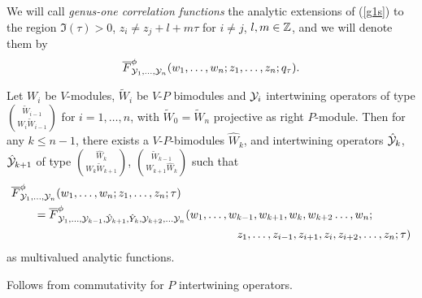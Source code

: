 \documentclass[12pt]{article}
\begin{document}
We will call \emph{genus-one correlation functions} the analytic extensions
of (\ref{g1s}) to the region $\Im (\tau) >0$,
$z_i \neq z_j + l + m\tau$ for $i\neq j$, $l,m\in \mathbb{Z}$,
and we will denote them by
$$
  \overline F^\phi_{\mathcal{Y}_1,\ldots, \mathcal{Y}_n}(w_1,\ldots, w_n; z_1,\ldots, z_n; q_\tau).
$$

\begin{prop}
  Let $W_i$ be $V$-modules, $\tilde W_i$ be $V$-$P$ bimodules
  and $\mathcal{Y}_i$ intertwining operators of type
  $\binom{\tilde W_{i-1}}{W_i \tilde W_{i-1}}$ for $i=1,\ldots, n$,
  with $\tilde W_0 = \tilde W_n$ projective as right $P$-module.
  Then for any $k\leq n-1$, there exists a $V$-$P$-bimodules $\hat W_k$,
  and intertwining operators $\hat {\mathcal{Y}}_k$, $\hat {\mathcal{Y}}_{k+1}$
  of type $\binom{\hat W_k}{W_k\tilde W_{k+1}}$,
  $\binom{\tilde W_{k-1}}{W_{k+1} \hat W_k}$ such that
  \begin{align*}
    &\overline
      F^\phi_{\Y_1, \ldots, \Y_n}(w_1,\ldots, w_n; z_1, \ldots, z_n; \tau)\\
    &\qquad  = \overline 
      F^\phi_{\Y_1, \ldots, \Y_{k-1},\hat \Y_{k+1},\hat Y_k, \Y_{k+2}
      ,\ldots\Y_n}(w_1,\ldots, w_{k-1}, w_{k+1}, w_k, w_{k+2} \ldots, w_n;\\
      &\hspace{7cm}
      z_1,\ldots, z_{i-1}, z_{i+1}, z_i, z_{i+2}, \ldots, z_n; \tau)
  \end{align*}
  as multivalued analytic functions.
\end{prop}
\proof 
  Follows from commutativity for $P$ intertwining operators.
\epfv
\end{document}
